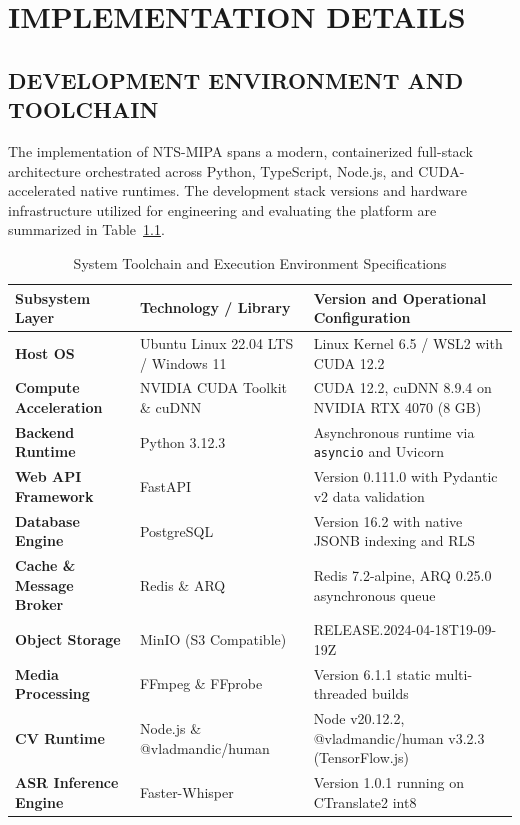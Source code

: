 \documentclass[12pt,a4paper,oneside]{report}
\begin{document}
\chapter{IMPLEMENTATION DETAILS}

\section{DEVELOPMENT ENVIRONMENT AND TOOLCHAIN}
The implementation of NTS-MIPA spans a modern, containerized full-stack architecture orchestrated across Python, TypeScript, Node.js, and CUDA-accelerated native runtimes. The development stack versions and hardware infrastructure utilized for engineering and evaluating the platform are summarized in Table~\ref{tab:dev_environment}.

\begin{table}[htbp]
\centering
\caption{System Toolchain and Execution Environment Specifications}
\label{tab:dev_environment}
\fontsize{9}{11}\selectfont
\begin{tabularx}{\textwidth}{@{}l p{4.2cm} X@{}}
\toprule
\textbf{Subsystem Layer} & \textbf{Technology / Library} & \textbf{Version and Operational Configuration} \\
\midrule
\textbf{Host OS} & Ubuntu Linux 22.04 LTS / Windows 11 & Linux Kernel 6.5 / WSL2 with CUDA 12.2 \\
\textbf{Compute Acceleration} & NVIDIA CUDA Toolkit \& cuDNN & CUDA 12.2, cuDNN 8.9.4 on NVIDIA RTX 4070 (8 GB) \\
\textbf{Backend Runtime} & Python 3.12.3 & Asynchronous runtime via \texttt{asyncio} and Uvicorn \\
\textbf{Web API Framework} & FastAPI & Version 0.111.0 with Pydantic v2 data validation \\
\textbf{Database Engine} & PostgreSQL & Version 16.2 with native JSONB indexing and RLS \\
\textbf{Cache \& Message Broker} & Redis \& ARQ & Redis 7.2-alpine, ARQ 0.25.0 asynchronous queue \\
\textbf{Object Storage} & MinIO (S3 Compatible) & RELEASE.2024-04-18T19-09-19Z \\
\textbf{Media Processing} & FFmpeg \& FFprobe & Version 6.1.1 static multi-threaded builds \\
\textbf{CV Runtime} & Node.js \& @vladmandic/human & Node v20.12.2, @vladmandic/human v3.2.3 (TensorFlow.js) \\
\textbf{ASR Inference Engine} & Faster-Whisper & Version 1.0.1 running on CTranslate2 int8 \\

\end{tabularx}
\end{table}
\end{document}
